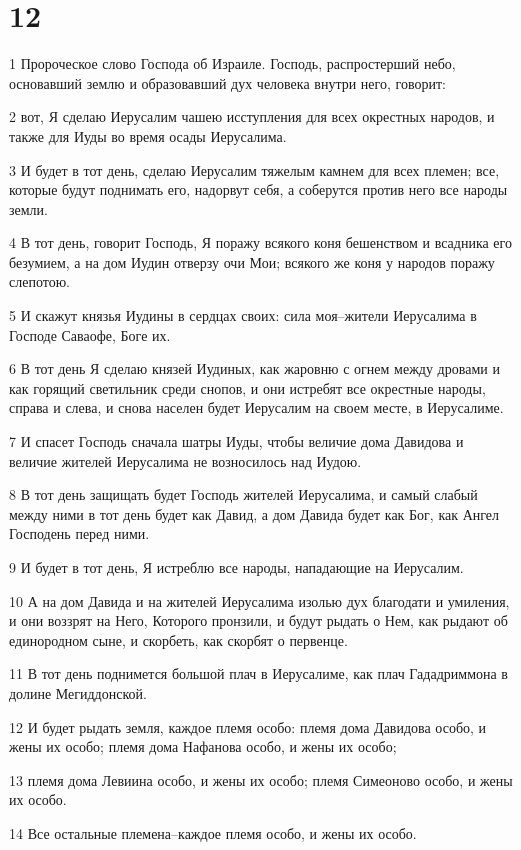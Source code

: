 \chapter{12}

\par 1 Пророческое слово Господа об Израиле. Господь, распростерший небо, основавший землю и образовавший дух человека внутри него, говорит:
\par 2 вот, Я сделаю Иерусалим чашею исступления для всех окрестных народов, и также для Иуды во время осады Иерусалима.
\par 3 И будет в тот день, сделаю Иерусалим тяжелым камнем для всех племен; все, которые будут поднимать его, надорвут себя, а соберутся против него все народы земли.
\par 4 В тот день, говорит Господь, Я поражу всякого коня бешенством и всадника его безумием, а на дом Иудин отверзу очи Мои; всякого же коня у народов поражу слепотою.
\par 5 И скажут князья Иудины в сердцах своих: сила моя--жители Иерусалима в Господе Саваофе, Боге их.
\par 6 В тот день Я сделаю князей Иудиных, как жаровню с огнем между дровами и как горящий светильник среди снопов, и они истребят все окрестные народы, справа и слева, и снова населен будет Иерусалим на своем месте, в Иерусалиме.
\par 7 И спасет Господь сначала шатры Иуды, чтобы величие дома Давидова и величие жителей Иерусалима не возносилось над Иудою.
\par 8 В тот день защищать будет Господь жителей Иерусалима, и самый слабый между ними в тот день будет как Давид, а дом Давида будет как Бог, как Ангел Господень перед ними.
\par 9 И будет в тот день, Я истреблю все народы, нападающие на Иерусалим.
\par 10 А на дом Давида и на жителей Иерусалима изолью дух благодати и умиления, и они воззрят на Него, Которого пронзили, и будут рыдать о Нем, как рыдают об единородном сыне, и скорбеть, как скорбят о первенце.
\par 11 В тот день поднимется большой плач в Иерусалиме, как плач Гададриммона в долине Мегиддонской.
\par 12 И будет рыдать земля, каждое племя особо: племя дома Давидова особо, и жены их особо; племя дома Нафанова особо, и жены их особо;
\par 13 племя дома Левиина особо, и жены их особо; племя Симеоново особо, и жены их особо.
\par 14 Все остальные племена--каждое племя особо, и жены их особо.

